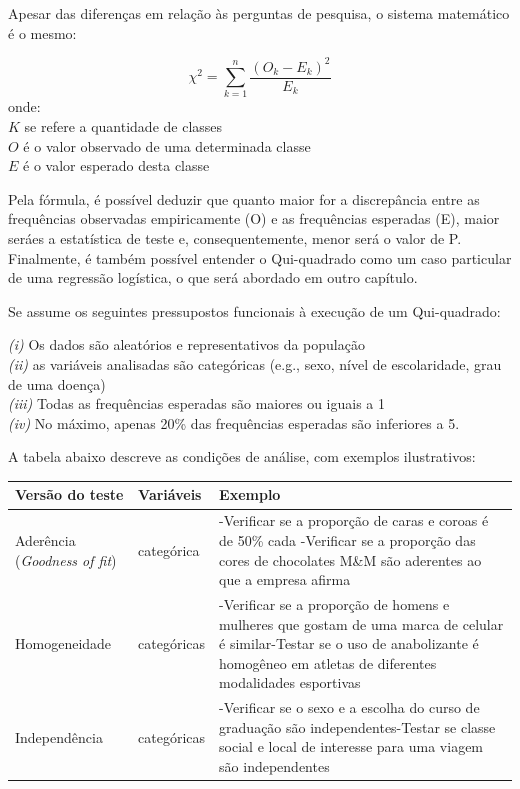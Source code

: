 \documentclass[
]{book}
\begin{document}
Apesar das diferenças em relação às perguntas de pesquisa, o sistema matemático é o mesmo:

\[\chi^2=\sum_{k=1}^{n} \frac{(O_k - E_k)^2}{E_k}\]
onde:\\
\(K\) se refere a quantidade de classes\\
\(O\) é o valor observado de uma determinada classe\\
\(E\) é o valor esperado desta classe

Pela fórmula, é possível deduzir que quanto maior for a discrepância entre as frequências observadas empiricamente (O) e as frequências esperadas (E), maior seráes a estatística de teste e, consequentemente, menor será o valor de P. Finalmente, é também possível entender o Qui-quadrado como um caso particular de uma regressão logística, o que será abordado em outro capítulo.

Se assume os seguintes pressupostos funcionais à execução de um Qui-quadrado:

\emph{(i)} Os dados são aleatórios e representativos da população\\
\emph{(ii)} as variáveis analisadas são categóricas (e.g., sexo, nível de escolaridade, grau de uma doença)\\
\emph{(iii)} Todas as frequências esperadas são maiores ou iguais a 1\\
\emph{(iv)} No máximo, apenas 20\% das frequências esperadas são inferiores a 5.

A tabela abaixo descreve as condições de análise, com exemplos ilustrativos:

\begin{longtable}[]{@{}
  >{\raggedright\arraybackslash}p{}
  >{\raggedright\arraybackslash}p{}
  >{\raggedright\arraybackslash}p{}@{}}
\toprule
Versão do teste & Variáveis & Exemplo \\
\midrule
\endhead
Aderência (\emph{Goodness of fit}) & 1 categórica & -Verificar se a proporção de caras e coroas é de 50\% cada -Verificar se a proporção das cores de chocolates M\&M são aderentes ao que a empresa afirma \\
Homogeneidade & 2 categóricas & -Verificar se a proporção de homens e mulheres que gostam de uma marca de celular é similar-Testar se o uso de anabolizante é homogêneo em atletas de diferentes modalidades esportivas \\
Independência & 2 categóricas & -Verificar se o sexo e a escolha do curso de graduação são independentes-Testar se classe social e local de interesse para uma viagem são independentes \\
\bottomrule
\end{longtable}
\end{document}

